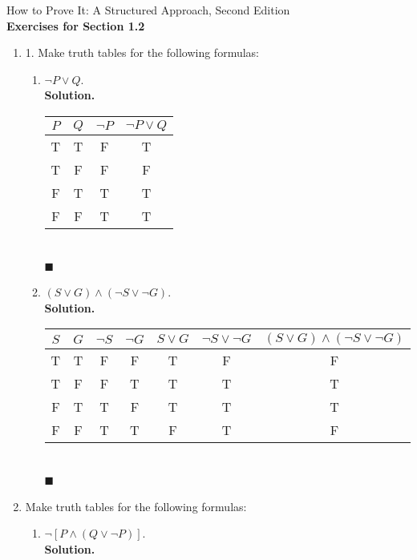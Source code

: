 \documentclass{report}
\newcommand{\sol}{\vspace{1em}\\\textbf{Solution.}\vspace{0.5em}}
\newcommand{\qed}{‎\\‎\hfill$\blacksquare$\vspace{1em}}
\begin{document}
\begin{center}
    \Large{How to Prove It: A Structured Approach, Second Edition}\\
    \vspace{1em}
    \Large{\textbf{Exercises for Section 1.2}}\vspace{1em}
\end{center}
\begin{enumerate}[leftmargin=*]
    \item 1. Make truth tables for the following formulas:
          \begin{enumerate}
              \item $\neg P \vee Q$. \sol{}
                    \begin{center}
                        \begin{tabular}{cccc}
                            $P$ & $Q$ & $\neg P$ & $\neg P \vee Q$ \\
                            \hline
                            T   & T   & F        & T               \\
                            T   & F   & F        & F               \\
                            F   & T   & T        & T               \\
                            F   & F   & T        & T
                        \end{tabular}
                    \end{center}\qed

              \item $(S \vee G) \wedge(\neg S \vee \neg G)$.\sol{}
                    \begin{center}
                        \begin{tabular}{ccccccc}
                            $S$ & $G$ & $\neg S$ & $\neg G$ & $S \vee G$ & $\neg S \vee \neg G$ & $(S \vee G) \wedge(\neg S \vee \neg G)$ \\
                            \hline
                            T   & T   & F        & F        & T          & F                    & F                                       \\
                            T   & F   & F        & T        & T          & T                    & T                                       \\
                            F   & T   & T        & F        & T          & T                    & T                                       \\
                            F   & F   & T        & T        & F          & T                    & F
                        \end{tabular}
                    \end{center}\qed
          \end{enumerate}
    \item Make truth tables for the following formulas:
          \begin{enumerate}
              \item $\neg[P \wedge(Q \vee \neg P)]$. \sol{}


\end{enumerate}
\end{enumerate}
\end{document}
